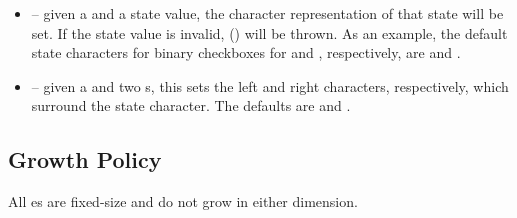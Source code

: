 \begin{itemize}
\item {} -- given a  and a state value,
  the character representation of that state will be set.  If the
  state value is invalid, 
  () will be thrown.  As an example, the
  default state characters for binary checkboxes for  and
  , respectively, are  and .
\item {} -- given a  and two
  s, this sets the left and right characters, respectively,
  which surround the state character.  The defaults are \fw{'['} and
    \fw{']'}.
\end{itemize}

\subsection{Growth Policy}

All es are fixed-size and do not grow in either
dimension.
